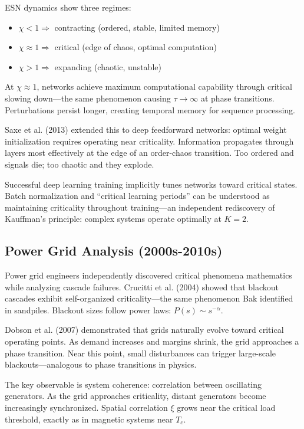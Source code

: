 \documentclass[11pt]{article}
\begin{document}
ESN dynamics show three regimes:
\begin{itemize}[nosep]
    \item $\chi < 1 \Longrightarrow$ contracting (ordered, stable, limited memory)
    \item $\chi \approx 1 \Longrightarrow$ critical (edge of chaos, optimal computation)
    \item $\chi > 1 \Longrightarrow$ expanding (chaotic, unstable)
\end{itemize}

At $\chi \approx 1$, networks achieve maximum computational capability through critical slowing down---the same phenomenon causing $\tau \to \infty$ at phase transitions. Perturbations persist longer, creating temporal memory for sequence processing.

Saxe et al. (2013) \cite{saxe2013} extended this to deep feedforward networks: optimal weight initialization requires operating near criticality. Information propagates through layers most effectively at the edge of an order-chaos transition. Too ordered and signals die; too chaotic and they explode.

Successful deep learning training implicitly tunes networks toward critical states. Batch normalization and ``critical learning periods'' can be understood as maintaining criticality throughout training---an independent rediscovery of Kauffman's principle: complex systems operate optimally at $K = 2$.

\subsection{Power Grid Analysis (2000s-2010s)}

Power grid engineers independently discovered critical phenomena mathematics while analyzing cascade failures. Crucitti et al. (2004) \cite{crucitti2004} showed that blackout cascades exhibit self-organized criticality---the same phenomenon Bak identified in sandpiles. Blackout sizes follow power laws: $P(s) \sim s^{-\alpha}$.

Dobson et al. (2007) \cite{dobson2007} demonstrated that grids naturally evolve toward critical operating points. As demand increases and margins shrink, the grid approaches a phase transition. Near this point, small disturbances can trigger large-scale blackouts---analogous to phase transitions in physics.

The key observable is system coherence: correlation between oscillating generators. As the grid approaches criticality, distant generators become increasingly synchronized. Spatial correlation $\xi$ grows near the critical load threshold, exactly as in magnetic systems near $T_c$.
\end{document}
